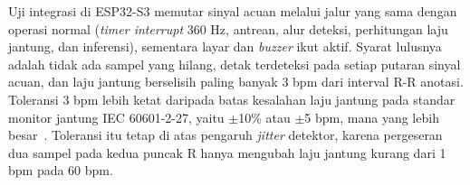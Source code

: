 Uji integrasi di ESP32-S3 memutar sinyal acuan melalui jalur yang sama dengan operasi normal (\textit{timer interrupt} 360 Hz, antrean, alur deteksi, perhitungan laju jantung, dan inferensi), sementara layar dan \textit{buzzer} ikut aktif. Syarat lulusnya adalah tidak ada sampel yang hilang, detak terdeteksi pada setiap putaran sinyal acuan, dan laju jantung berselisih paling banyak 3 bpm dari interval R-R anotasi. Toleransi 3 bpm lebih ketat daripada batas kesalahan laju jantung pada standar monitor jantung IEC 60601-2-27, yaitu $\pm$10\% atau $\pm$5 bpm, mana yang lebih besar~\cite{iec_60601_2_27_2011}. Toleransi itu tetap di atas pengaruh \textit{jitter} detektor, karena pergeseran dua sampel pada kedua puncak R hanya mengubah laju jantung kurang dari 1 bpm pada 60 bpm.
